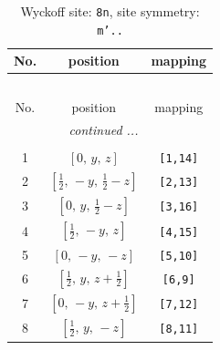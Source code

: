 \documentclass[fleqn,8pt]{jsarticle}
\begin{document}
\begin{longtable}{ccc}
\caption{Wyckoff site: {\tt 8n}, site symmetry: {\tt m'..}}
 \\
 \hline \hline
No. & position & mapping \\ \hline \endfirsthead

\multicolumn{2}{l}{\tablename\ \thetable{}} \\
 \hline \hline
No. & position & mapping \\ \hline \endhead

 \hline \hline
\multicolumn{2}{r}{\footnotesize\it continued ...} \\ \endfoot

 \hline \hline
\multicolumn{2}{r}{} \\ \endlastfoot

1 & $\left[ 0,\, y,\, z \right]$ & {\tt [1,14]} \\ \hline
2 & $\left[ \frac{1}{2},\, - y,\, \frac{1}{2} - z \right]$ & {\tt [2,13]} \\ \hline
3 & $\left[ 0,\, y,\, \frac{1}{2} - z \right]$ & {\tt [3,16]} \\ \hline
4 & $\left[ \frac{1}{2},\, - y,\, z \right]$ & {\tt [4,15]} \\ \hline
5 & $\left[ 0,\, - y,\, - z \right]$ & {\tt [5,10]} \\ \hline
6 & $\left[ \frac{1}{2},\, y,\, z + \frac{1}{2} \right]$ & {\tt [6,9]} \\ \hline
7 & $\left[ 0,\, - y,\, z + \frac{1}{2} \right]$ & {\tt [7,12]} \\ \hline
8 & $\left[ \frac{1}{2},\, y,\, - z \right]$ & {\tt [8,11]} \\
\end{longtable}
\renewcommand{\arraystretch}{1.2}
\end{document}
